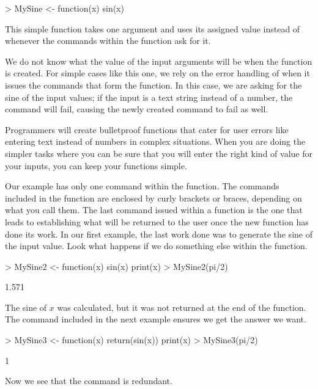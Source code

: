 \begin{Schunk}
\begin{Sinput}
> MySine <- function(x){ sin(x)} 
\end{Sinput}
\end{Schunk}

This simple function takes one argument  and uses its assigned value instead of  whenever the commands within the function ask for it. 
 
We do not know what the value of the input arguments will be when the function is created. For simple cases like this one, we rely on the error handling of \R{} when it issues the commands that form the function. In this case, we are asking for the sine of the input values; if the input is a text string instead of a number, the  command will fail, causing the newly created  command to fail as well. 
 
Programmers will create bulletproof functions that cater for user errors like entering text instead of numbers in complex situations. When you are doing the simpler tasks where you can be sure that you will enter the right kind of value for your inputs, you can keep your functions simple. 
 
Our example has only one command within the function. The commands included in the function are enclosed by curly brackets or braces, depending on what you call them. The last command issued within a function is the one that leads to establishing what will be returned to the user once the new function has done its work. In our first example, the last work done was to generate the sine of the input value. Look what happens if we do something else within the function. 

\begin{Schunk}
\begin{Sinput}
> MySine2 <- function(x){ sin(x) 
   print(x)} 
> MySine2(pi/2) 
\end{Sinput}
\begin{Soutput}
[1] 1.571
\end{Soutput}
\end{Schunk}

The sine of $x$ was calculated, but it was not returned at the end of the function. 
The  command included in the next example ensures we get the answer we want. 

\begin{Schunk}
\begin{Sinput}
> MySine3 <- function(x){ return(sin(x)) 
   print(x)} 
> MySine3(pi/2) 
\end{Sinput}
\begin{Soutput}
[1] 1
\end{Soutput}
\end{Schunk}

Now we see that the  command is redundant. 
 
 
 

